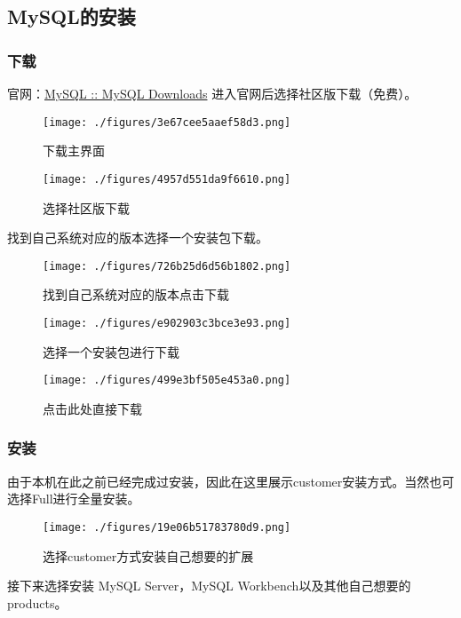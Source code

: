 \subsection{MySQL的安装}

\subsubsection{下载}
官网：\href{https://www.mysql.com/downloads/}{MySQL :: MySQL Downloads}
进入官网后选择社区版下载（免费）。
\begin{figure}[ht]
\centering
\texttt{[image: ./figures/3e67cee5aaef58d3.png]}
\caption{下载主界面} \label{fig_MSQ001_3}
\end{figure}

\begin{figure}[ht]
\centering
\texttt{[image: ./figures/4957d551da9f6610.png]}
\caption{选择社区版下载} \label{fig_MSQ001_4}
\end{figure}
找到自己系统对应的版本选择一个安装包下载。
\begin{figure}[ht]
\centering
\texttt{[image: ./figures/726b25d6d56b1802.png]}
\caption{找到自己系统对应的版本点击下载} \label{fig_MSQ001_5}
\end{figure}

\begin{figure}[ht]
\centering
\texttt{[image: ./figures/e902903c3bce3e93.png]}
\caption{选择一个安装包进行下载} \label{fig_MSQ001_6}
\end{figure}

\begin{figure}[ht]
\centering
\texttt{[image: ./figures/499e3bf505e453a0.png]}
\caption{点击此处直接下载} \label{fig_MSQ001_7}
\end{figure}

\subsubsection{安装}
由于本机在此之前已经完成过安装，因此在这里展示customer安装方式。当然也可选择Full进行全量安装。
\begin{figure}[ht]
\centering
\texttt{[image: ./figures/19e06b51783780d9.png]}
\caption{选择customer方式安装自己想要的扩展} \label{fig_MSQ001_8}
\end{figure}
接下来选择安装 MySQL Server，MySQL Workbench以及其他自己想要的products。
